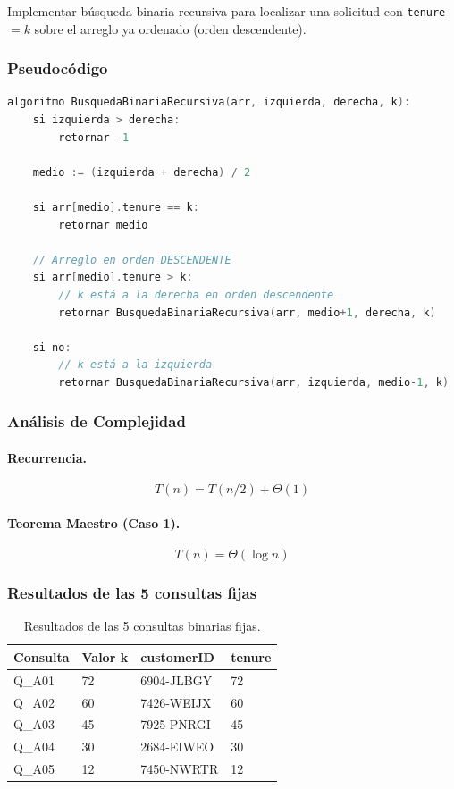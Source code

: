 \documentclass[12pt, a4paper]{article}
\begin{document}
Implementar búsqueda binaria recursiva para localizar una solicitud con \texttt{tenure} $= k$ sobre el arreglo ya ordenado (orden descendente).

\subsubsection*{Pseudocódigo}

\begin{lstlisting}[language=C++, caption=Búsqueda Binaria Recursiva (orden descendente)]
algoritmo BusquedaBinariaRecursiva(arr, izquierda, derecha, k):
    si izquierda > derecha:
        retornar -1
    
    medio := (izquierda + derecha) / 2
    
    si arr[medio].tenure == k:
        retornar medio
    
    // Arreglo en orden DESCENDENTE
    si arr[medio].tenure > k:
        // k está a la derecha en orden descendente
        retornar BusquedaBinariaRecursiva(arr, medio+1, derecha, k)
    
    si no:
        // k está a la izquierda
        retornar BusquedaBinariaRecursiva(arr, izquierda, medio-1, k)
\end{lstlisting}

\subsubsection*{Análisis de Complejidad}

\paragraph{Recurrencia.}
\[
T(n) = T(n/2) + \Theta(1)
\]

\paragraph{Teorema Maestro (Caso 1).}
\[
T(n) = \Theta(\log n)
\]

\subsubsection*{Resultados de las 5 consultas fijas}

\begin{table}[h!]
\centering
\small
\begin{tabularx}{\textwidth}{llll}
\toprule
\textbf{Consulta} & \textbf{Valor k} & \textbf{customerID} & \textbf{tenure} \\
\midrule
Q\_A01 & 72 & 6904-JLBGY & 72 \\
Q\_A02 & 60 & 7426-WEIJX & 60 \\
Q\_A03 & 45 & 7925-PNRGI & 45 \\
Q\_A04 & 30 & 2684-EIWEO & 30 \\
Q\_A05 & 12 & 7450-NWRTR & 12 \\
\bottomrule
\end{tabularx}
\caption{Resultados de las 5 consultas binarias fijas.}
\end{table}
\end{document}
